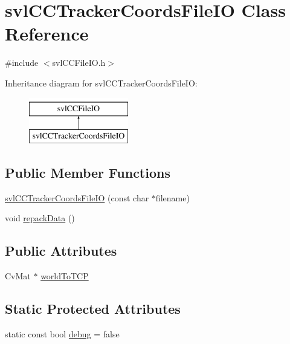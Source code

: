 \hypertarget{classsvl_c_c_tracker_coords_file_i_o}{\section{svl\-C\-C\-Tracker\-Coords\-File\-I\-O Class Reference}
\label{classsvl_c_c_tracker_coords_file_i_o}
}


{\ttfamily \#include $<$svl\-C\-C\-File\-I\-O.\-h$>$}

Inheritance diagram for svl\-C\-C\-Tracker\-Coords\-File\-I\-O\-:\begin{figure}[H]
\begin{center}
\leavevmode
\includegraphics[height=2.000000cm]{d1/d44/classsvl_c_c_tracker_coords_file_i_o}
\end{center}
\end{figure}
\subsection*{Public Member Functions}
\begin{DoxyCompactItemize}
\item 
\hyperlink{classsvl_c_c_tracker_coords_file_i_o_ab7e12fde9eac5294ca3289f72819c542}{svl\-C\-C\-Tracker\-Coords\-File\-I\-O} (const char $\ast$filename)
\item 
void \hyperlink{classsvl_c_c_tracker_coords_file_i_o_a20551f5db6ea17d800c833cdd8734fd2}{repack\-Data} ()
\end{DoxyCompactItemize}
\subsection*{Public Attributes}
\begin{DoxyCompactItemize}
\item 
Cv\-Mat $\ast$ \hyperlink{classsvl_c_c_tracker_coords_file_i_o_a52c6b69d40df95c9e2a2028415c3ac5f}{world\-To\-T\-C\-P}
\end{DoxyCompactItemize}
\subsection*{Static Protected Attributes}
\begin{DoxyCompactItemize}
\item 
static const bool \hyperlink{classsvl_c_c_tracker_coords_file_i_o_aa792add13a0e86c73730b6f090dda22e}{debug} = false
\end{DoxyCompactItemize}
